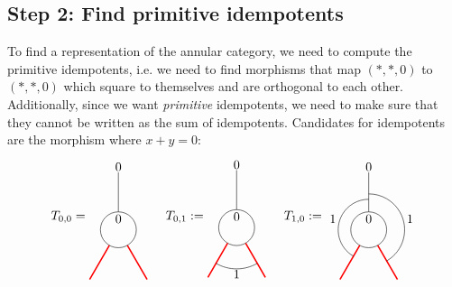 \subsection*{Step 2: Find primitive idempotents} To find a representation of the annular category, we need to compute the primitive idempotents, i.e. we need to find morphisms that map $(*,*,0)$ to $(*,*,0)$ which square to themselves and are orthogonal to each other. Additionally, since we want \emph{primitive} idempotents, we need to make sure that they cannot be written as the sum of idempotents.
Candidates for idempotents are the morphism where $x+y=0$:
	\begin{equation}
		T_{0,0}=
		\begin{tikzpicture}[scale=1,baseline=(current bounding box.center)]
			\draw (0,0) circle (0.5cm);
			\draw[red,line width=0.4mm]
			\foreach \a in {-60, -120} {
				(\a:0.5) -- (\a:1.6)
			};
			\draw[] (90:0.5) -- (90:1.6);
			\node at (90:.3cm){$0$};\node at (90:1.75cm){$0$};
		\end{tikzpicture}
		\hspace{5mm}
		T_{0,1}:=
		\begin{tikzpicture}[scale=1,baseline=(current bounding box.center)]
		\draw (0,0) circle (0.5cm);
		\draw[red,line width=0.4mm]
		\foreach \a in {-60, -120} {
			(\a:0.5) -- (\a:1.6)
		};
		\draw ([shift=(-120:1.15cm)]0,0) arc (-120:-60:1.15cm);
		\draw[] (90:0.5) -- (90:1.6);
		\node at (90:.3cm){$0$};\node at (90:1.75cm){$0$};
		\node at (0,-1.3) {$1$};
		\end{tikzpicture}
		\hspace{5mm}
		T_{1,0}:=
		\begin{tikzpicture}[scale=1,baseline=(current bounding box.center)]
		\draw (0,0) circle (0.5cm);
		\draw[red,line width=0.4mm]
		\foreach \a in {-60, -120} {
			(\a:0.5) -- (\a:1.6)
		};
		\draw ([shift=(-60:1cm)]0,0) arc (-60:90:1cm);
		\draw ([shift=(240:0.85cm)]0,0) arc (240:90:0.85cm);
		\draw[] (90:0.5) -- (90:1.6);
		\node at (90:.3cm){$0$};\node at (90:1.75cm){$0$};
		\node at (-1,0.3) {$1$};
		\node at (1.15,0.3) {$1$};

\end{tikzpicture}
\end{equation}
